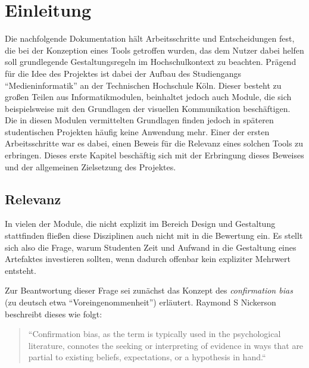 
\chapter{Einleitung} %

\label{Einleitung} %


Die nachfolgende Dokumentation hält Arbeitsschritte und Entscheidungen fest, die bei der  Konzeption eines Tools getroffen wurden, das dem Nutzer dabei helfen soll grundlegende Gestaltungsregeln im Hochschulkontext zu beachten.
Prägend für die Idee des Projektes ist dabei der Aufbau des Studiengangs “Medieninformatik” an der Technischen Hochschule Köln. Dieser besteht zu großen Teilen aus Informatikmodulen, beinhaltet jedoch auch Module, die sich beispielsweise mit den Grundlagen der visuellen Kommunikation beschäftigen. Die in diesen Modulen vermittelten Grundlagen finden jedoch in späteren studentischen Projekten häufig keine Anwendung mehr.
Einer der ersten Arbeitsschritte war es dabei, einen Beweis für die Relevanz eines solchen Tools zu erbringen. Dieses erste Kapitel beschäftig sich mit der Erbringung dieses Beweises und der allgemeinen Zielsetzung des Projektes.


\section{Relevanz}
In vielen der Module, die nicht explizit im Bereich Design und Gestaltung stattfinden fließen diese Disziplinen auch nicht mit in die Bewertung ein. Es stellt sich also die Frage, warum Studenten Zeit und Aufwand in die Gestaltung eines Artefaktes investieren sollten, wenn dadurch offenbar kein expliziter Mehrwert entsteht.

Zur Beantwortung dieser Frage sei zunächst das Konzept des \textit{confirmation bias} (zu deutsch etwa “Voreingenommenheit”) erläutert. Raymond S Nickerson beschreibt dieses wie folgt:

\begin{quote}
“Confirmation bias, as the term is typically used in the psychological literature, connotes the seeking or interpreting of evidence in ways that are partial to existing beliefs, expectations, or a hypothesis in hand.“ \cite{nickerson1998confirmation}
\end{quote}

